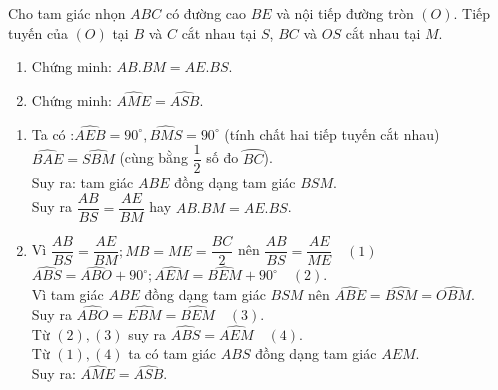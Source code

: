 \begin{ex}%
Cho tam giác nhọn $ABC$ có đường cao $BE$ và nội tiếp đường tròn $(O )$. 
Tiếp tuyến của $(O )$ tại $B$ và $C$ cắt nhau tại $S$, $BC$ và $OS$ cắt nhau tại $M$.
\begin{enumerate}
\item Chứng minh: $AB.BM=AE.BS$.
\item Chứng minh: $\widehat{AME}=\widehat{ASB}$.
\end{enumerate} 
\loigiai
    {
    \begin{center}
    \end{center}
    \begin{enumerate}
        \item Ta có :$\widehat{AEB}=90^\circ,  \widehat{BMS}=90^\circ$ (tính chất hai tiếp tuyến cắt nhau)\\
$\widehat{BAE}=\widehat{SBM}$ (cùng bằng $\dfrac{1}{2}$ số đo $\wideparen{BC}$).\\
Suy ra: tam giác $ABE$  đồng dạng tam giác $BSM$.\\
Suy ra $\dfrac{AB}{BS}=\dfrac{AE}{BM}$ hay $AB.BM=AE.BS$.
        \item Vì  $\dfrac{AB}{BS}=\dfrac{AE}{BM}; MB=ME=\dfrac{BC}{2}$  nên $\dfrac{AB}{BS}=\dfrac{AE}{ME} \quad (1)$\\
$\widehat{ABS}=\widehat{ABO}+90^\circ; \widehat{AEM}=\widehat{BEM}+90^\circ \quad (2)$.\\
Vì tam giác $ABE$  đồng dạng tam giác $BSM$ nên
$\widehat{ABE}=\widehat{BSM}=\widehat{OBM}$.\\
Suy ra $\widehat{ABO}=\widehat{EBM}=\widehat{BEM} \quad (3)$.\\
Từ $(2), (3)$ suy ra $\widehat{ABS}=\widehat{AEM} \quad (4)$.\\
Từ $(1), (4)$ ta có  tam giác $ABS$ đồng dạng tam giác $AEM$.\\
Suy ra: $\widehat{AME}=\widehat{ASB}$.
\end{enumerate}
    }
\end{ex}

